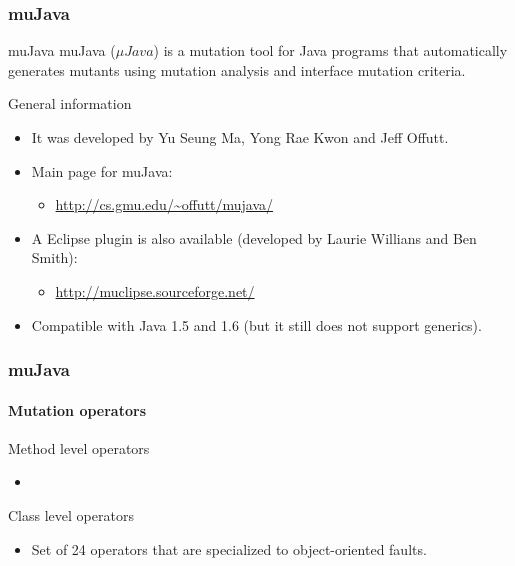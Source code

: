 \begin{frame}[parent={cmap:mujava}, hasprev=false, hasnext=true]
\frametitle{muJava}
\label{concept:mujava}

\begin{block:concept}{muJava}
muJava ($\mu{}Java$) is a mutation tool for Java programs that automatically
generates mutants using mutation analysis and interface mutation criteria.
\end{block:concept}

\begin{block:fact}{General information}
\begin{itemize}
	\item It was developed by Yu Seung Ma, Yong Rae Kwon and Jeff Offutt.

	\item Main page for muJava:
	\begin{itemize}
		\item \url{http://cs.gmu.edu/~offutt/mujava/}
	\end{itemize}

	\item A Eclipse plugin is also available (developed by Laurie Willians and
	Ben Smith):
	\begin{itemize}
		\item \url{http://muclipse.sourceforge.net/}
	\end{itemize}

	\item Compatible with Java 1.5 and 1.6 (but it still does not support
	generics).
\end{itemize}
\end{block:fact}
\end{frame}


\begin{frame}[hasprev=true, hasnext=true]
\frametitle{muJava}
\framesubtitle{Mutation operators}

\begin{block:fact}{Method level operators}
\begin{itemize}
	\item
\end{itemize}
\end{block:fact}


\begin{block:fact}{Class level operators}
\begin{itemize}
	\item Set of 24 operators that are specialized to object-oriented faults.
\end{itemize}
\end{block:fact}
\end{frame}


